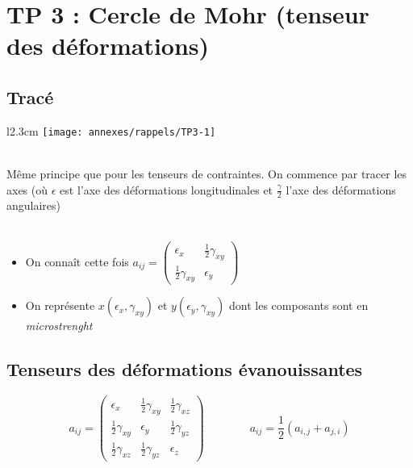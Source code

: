 \section*{TP 3 : Cercle de Mohr (tenseur des déformations)}
\subsection*{Tracé}

\begin{wrapfigure}[4]{l}{2.3cm}
	\texttt{[image: annexes/rappels/TP3-1]}
\end{wrapfigure}	
\ \\ Même principe que pour les tenseurs de contraintes. On commence par tracer les axes (où $\epsilon$ est l'axe des déformations longitudinales et $\frac{\gamma}{2}$ l'axe des déformations angulaires)\\\\

\begin{itemize}	
	\item On connaît cette fois $a_{ij} = 
	      \left(	
	      \begin{array}{cc}
	      	\epsilon _x             & \frac{1}{2}\gamma _{xy} \\ 
	      	\frac{1}{2}\gamma _{xy} & \epsilon _y             
	      \end{array}
	      \right) $
	      	
	\item On représente $x(\epsilon _x,\gamma _{xy})$ et $y(\epsilon _y ,\gamma _{xy})$ dont les composants sont en \textit{microstrenght}
\end{itemize}

\subsection*{Tenseurs des déformations évanouissantes}
\begin{equation}
	a_ {ij} = 
	\left(
	\begin{array}{ccc}
		\epsilon _x             & \frac{1}{2}\gamma _{xy} & \frac{1}{2}\gamma _{xz} \\ 
		\frac{1}{2}\gamma _{xy} & \epsilon _y             & \frac{1}{2}\gamma _{yz} \\ 
		\frac{1}{2}\gamma _{xz} & \frac{1}{2}\gamma _{yz} & \epsilon _z             
	\end{array} 
	\right)
	\qquad \qquad
	a_{ij} = \frac{1}{2}(a_{i,j} + a_{j,i})
\end{equation}

